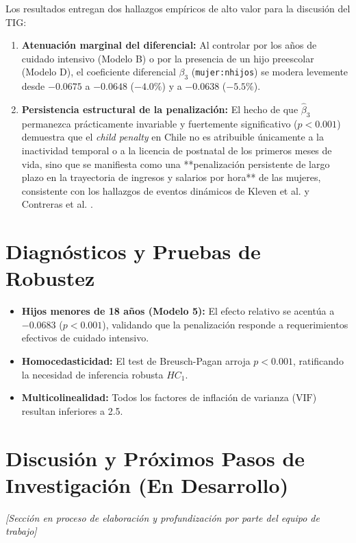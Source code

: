 \documentclass[11pt,a4paper]{article}
\begin{document}
Los resultados entregan dos hallazgos empíricos de alto valor para la discusión del TIG:
\begin{enumerate}
    \item \textbf{Atenuación marginal del diferencial:} Al controlar por los años de cuidado intensivo (Modelo B) o por la presencia de un hijo preescolar (Modelo D), el coeficiente diferencial $\beta_3$ (\texttt{mujer:nhijos}) se modera levemente desde $-0.0675$ a $-0.0648$ ($-4.0\%$) y a $-0.0638$ ($-5.5\%$).
    \item \textbf{Persistencia estructural de la penalización:} El hecho de que $\hat{\beta}_3$ permanezca prácticamente invariable y fuertemente significativo ($p < 0.001$) demuestra que el \textit{child penalty} en Chile no es atribuible únicamente a la inactividad temporal o a la licencia de postnatal de los primeros meses de vida, sino que se manifiesta como una **penalización persistente de largo plazo en la trayectoria de ingresos y salarios por hora** de las mujeres, consistente con los hallazgos de eventos dinámicos de Kleven et al. \cite{kleven2019} y Contreras et al. \cite{contreras2023}.
\end{enumerate}

\section{Diagnósticos y Pruebas de Robustez}
\begin{itemize}
    \item \textbf{Hijos menores de 18 años (Modelo 5):} El efecto relativo se acentúa a $-0.0683$ ($p < 0.001$), validando que la penalización responde a requerimientos efectivos de cuidado intensivo.
    \item \textbf{Homocedasticidad:} El test de Breusch-Pagan arroja $p < 0.001$, ratificando la necesidad de inferencia robusta $HC_1$.
    \item \textbf{Multicolinealidad:} Todos los factores de inflación de varianza ($\text{VIF}$) resultan inferiores a 2.5.
\end{itemize}

\section{Discusión y Próximos Pasos de Investigación (En Desarrollo)}
\textit{[Sección en proceso de elaboración y profundización por parte del equipo de trabajo]}
\end{document}
